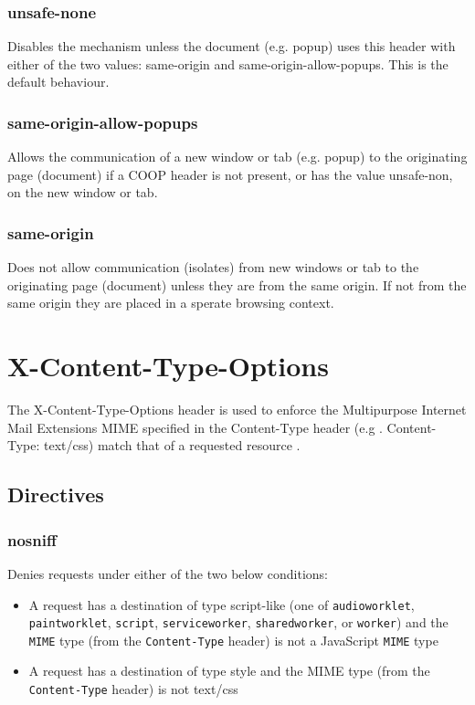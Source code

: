 \documentclass{mscreport}
\begin{document}
\subsubsection{unsafe-none}
Disables the mechanism unless the document (e.g. popup) uses this header with either of the two values: same-origin and same-origin-allow-popups. This is the default behaviour.

\subsubsection{same-origin-allow-popups}
Allows the communication of a new window or tab (e.g. popup) to the originating page (document) if a COOP header is not present, or has the value unsafe-non, on the new window or tab.

\subsubsection{same-origin}
Does not allow communication (isolates) from new windows or tab to the originating page (document) unless they are from the same origin. If not from the same origin they are placed in a sperate browsing context.

\newpage

\section{X-Content-Type-Options}
\label{section:xcto}

The X-Content-Type-Options header is used to enforce the Multipurpose Internet Mail Extensions MIME specified in the Content-Type header (e.g . Content-Type: text/css) match that of a requested resource \cite{Apple_undated-hz}.
\subsection{Directives}
\subsubsection{nosniff}

Denies requests under either of the two below conditions:

\begin{itemize}
	\setlength\itemsep{0.1em}
	\item A request has a destination of type script-like (one of \texttt{audioworklet}, \texttt{paintworklet}, \texttt{script}, \texttt{serviceworker}, \texttt{sharedworker}, or \texttt{worker}) and the \texttt{MIME} type (from the \texttt{Content-Type} header) is not a JavaScript \texttt{MIME} type
	\item A request has a destination of type style and the MIME type (from the \texttt{Content-Type} header) is not text/css
\end{itemize}
\end{document}

